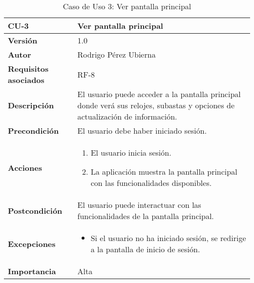\begin{table}[p]
	\centering
	\begin{tabularx}{\linewidth}{ p{} p{} }
		\toprule
		\textbf{CU-3} & \textbf{Ver pantalla principal}\\
		\toprule
		\textbf{Versión} & 1.0 \\
		\textbf{Autor} & Rodrigo Pérez Ubierna \\
		\textbf{Requisitos asociados} & RF-8 \\
		\textbf{Descripción} & El usuario puede acceder a la pantalla principal donde verá sus relojes, subastas y opciones de actualización de información. \\
		\textbf{Precondición} & El usuario debe haber iniciado sesión. \\
		\textbf{Acciones} &
		\begin{enumerate}
			\def\labelenumi{\arabic{enumi}.}
			\tightlist
			\item El usuario inicia sesión.
			\item La aplicación muestra la pantalla principal con las funcionalidades disponibles.
		\end{enumerate}\\
		\textbf{Postcondición} & El usuario puede interactuar con las funcionalidades de la pantalla principal. \\
		\textbf{Excepciones} &
			\begin{itemize}
				\item Si el usuario no ha iniciado sesión, se redirige a la pantalla de inicio de sesión.
			\end{itemize} \\
		\textbf{Importancia} & Alta \\
		\bottomrule
	\end{tabularx}
	\caption{Caso de Uso 3: Ver pantalla principal}
\end{table}

